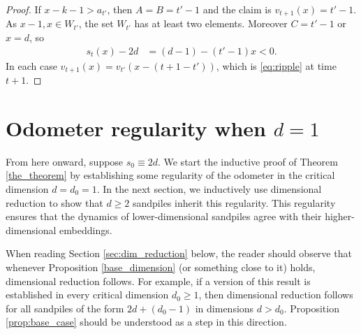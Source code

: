 \documentclass[12pt]{amsart}
\begin{document}
\begin{proof}
		If $x - k - 1 > a_{t'}$, then $A = B = t'-1$ and the claim is $v_{t+1}(x) = t'-1$. As $x - 1, x \in W_{t'}$, the set $W_{t'}$ has at least two elements. Moreover $C = t'-1$ or $x = d$, so
		\begin{align*}
		s_t(x) - 2d &= (d-1) - (t'-1) x < 0.
		\end{align*}
		In each case $v_{t+1}(x) = v_{t'}(x - (t+1-t'))$, which is \eqref{eq:ripple} at time $t+1$.
		
		
		
		
		
		
		
		
		
	\end{proof}
	
	
	
	\section{Odometer regularity when \texorpdfstring{$d = 1$}{d=1}} \label{sec:base_regularity}
		From here onward, suppose $s_0 \equiv 2 d$. We start the inductive proof of Theorem \ref{the_theorem} by establishing some regularity of the odometer in the critical dimension $d=d_0=1$.   In the next section, we inductively use dimensional reduction to show that $d \geq 2$ sandpiles inherit this regularity. This regularity ensures that the dynamics of lower-dimensional sandpiles agree with their higher-dimensional embeddings. 
		
		When reading Section \ref{sec:dim_reduction} below, the reader should observe that whenever Proposition \ref{base_dimension} (or something close to it) holds, dimensional reduction 
		follows. For example, if a version of this result is established in every critical dimension $d_0 \geq 1$,  
		then dimensional reduction follows for all sandpiles of the form $2 d + (d_0 - 1)$ in dimensions $d > d_0$. 
		Proposition \ref{prop:base_case} should be understood as a step in this direction. 


	
	
\end{document}
